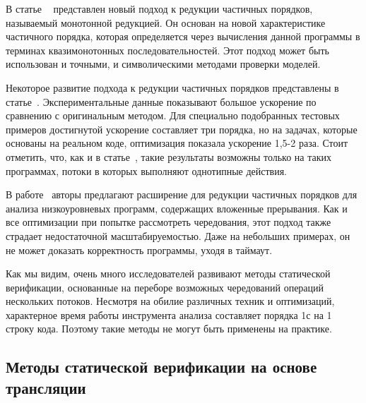В статье ~\cite{Kahlon:2009} представлен новый подход к редукции частичных порядков, называемый монотонной редукцией.
Он основан на новой характеристике частичного порядка, которая определяется через вычисления данной программы в терминах квазимонотонных последовательностей.
Этот подход может быть использован и точными, и символическими методами проверки моделей.

Некоторое развитие подхода к редукции частичных порядков представлены в статье~\cite{Abdulla:2014}.
Экспериментальные данные показывают большое ускорение по сравнению с оригинальным методом.
Для специально подобранных тестовых примеров достигнутой ускорение составляет три порядка, но на задачах, которые основаны на реальном коде, оптимизация показала ускорение  1,5-2 раза.
Стоит отметить, что, как и в статье~\cite{Basler:2009}, такие результаты возможны только на таких программах, потоки в которых выполняют однотипные действия. 

В работе~\cite{KroeningLMST15} авторы предлагают расширение для редукции частичных порядков для анализа низкоуровневых программ, содержащих вложенные прерывания. 
Как и все оптимизации при попытке рассмотреть чередования, этот подход также страдает недостаточной масштабируемостью. 
Даже на небольших примерах, он не может доказать корректность программы, уходя в таймаут.

Как мы видим, очень много исследователей развивают методы статической верификации, основанные на переборе возможных чередований операций нескольких потоков. 
Несмотря на обилие различных техник и оптимизаций, характерное время работы инструмента анализа составляет порядка 1с на 1 строку кода. 
Поэтому такие методы не могут быть применены на практике.


\subsection{Методы статической верификации на основе трансляции}

